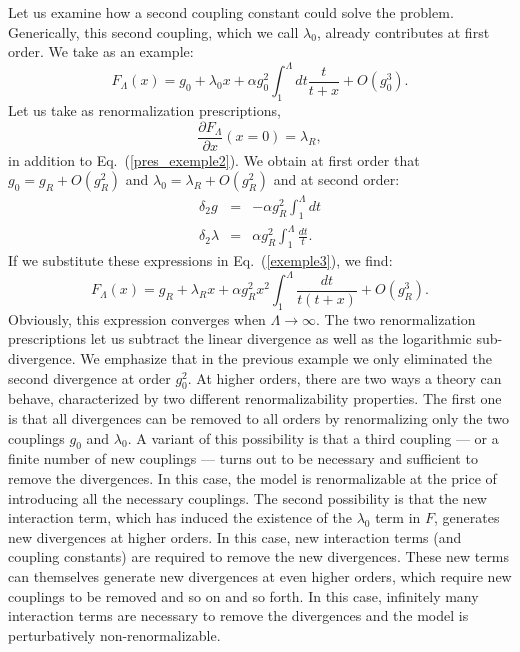 \documentclass[floatfix,preprintnumbers,amsmath,amssymb,prb,12pt]{revtex4-1}
\begin{document}
{{Let us examine how a second coupling constant could solve the
problem. Generically, this second coupling, which we call
$\lambda_0$, already contributes at first order. We take as an
example:
\begin{equation}
F_{\Lambda}(x)=g_0 +\lambda_0 x + \alpha g_0^2 \int_1^\Lambda dt 
\frac{t}{t+x}+O(g_0^3).
\label{exemple3}
\end{equation}
Let us take as renormalization prescriptions,
\begin{equation}
\frac{\partial F_{\Lambda}}{\partial x} (x=0)=\lambda_R,
\end{equation}
in addition to Eq.~(\ref{pres_exemple2}). We obtain at first order
that $g_0=g_R +O(g_R^2)$ and $\lambda_0=\lambda_R +O(g_R^2)$ and
at second order:
\begin{eqnarray}
\delta_2 g&=& -\alpha g_R^2
\int_1^\Lambda dt\\
\delta_2 \lambda&=& \alpha g_R^2 \int_1^\Lambda
\frac{dt}{t}.
\end{eqnarray}
If we substitute these expressions in Eq.~(\ref{exemple3}), we
find:
\begin{equation}
F_{\Lambda}(x)=g_R +\lambda_R x + \alpha g_R^2 x^2\int_1^\Lambda
\frac{dt}{t(t+x)}+O(g_R^3).
\label{a8}
\end{equation} Obviously, this expression converges when
$\Lambda\to \infty$. The two renormalization prescriptions let us
subtract the linear divergence as well as the logarithmic
sub-divergence. We emphasize that in the previous example we 
only eliminated the second divergence at order $g_0^2$. At higher
orders, there are two ways a theory can behave, characterized by
two different renormalizability properties. The first one is that
all divergences can be removed to all orders by renormalizing
only the two couplings $g_0$ and $\lambda_0$. A variant of this
possibility is that a third coupling --- or a finite number of new
couplings --- turns out to be necessary and sufficient to remove
the divergences. In this case, the model is renormalizable at the price of introducing all
the necessary couplings. The
second possibility is that the new interaction term, which has
induced the existence of the $\lambda_0$ term in $F$, generates 
new divergences at
higher orders. In this case, new interaction terms (and coupling
constants) are required to remove the new divergences. These
new terms can themselves generate new
divergences at even higher orders, which require new couplings
to be removed and so on and so forth. In this case, infinitely
many interaction terms are necessary to remove the divergences
and the model is perturbatively non-renormalizable.

}}
\end{document}
